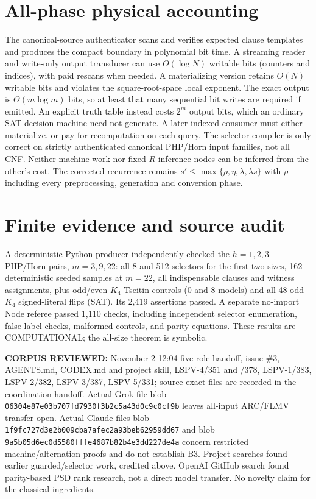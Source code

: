 \documentclass[11pt]{article}
\begin{document}
\section*{All-phase physical accounting}
The canonical-source authenticator scans and verifies expected clause templates and produces the compact boundary in polynomial bit time. A streaming reader and write-only output transducer can use $O(\log N)$ writable bits (counters and indices), with paid rescans when needed. A materializing version retains $O(N)$ writable bits and violates the square-root-space local exponent. The exact output is $\Theta(m\log m)$ bits, so at least that many sequential bit writes are required if emitted. An explicit truth table instead costs $2^m$ output bits, which an ordinary SAT decision machine need not generate. A later indexed consumer must either materialize, or pay for recomputation on each query. The selector compiler is only correct on strictly authenticated canonical PHP/Horn input families, not all CNF. Neither machine work nor fixed-$R$ inference nodes can be inferred from the other's cost. The corrected recurrence remains $s'\le\max\{\rho,\eta,\lambda,\lambda s\}$ with $\rho$ including every preprocessing, generation and conversion phase.

\section*{Finite evidence and source audit}
A deterministic Python producer independently checked the $h=1,2,3$ PHP/Horn pairs, $m=3,9,22$: all 8 and 512 selectors for the first two sizes, 162 deterministic seeded samples at $m=22$, all indispensable clauses and witness assignments, plus odd/even $K_4$ Tseitin controls (0 and 8 models) and all 48 odd-$K_4$ signed-literal flips (SAT). Its 2,419 assertions passed. A separate no-import Node referee passed 1,110 checks, including independent selector enumeration, false-label checks, malformed controls, and parity equations. These results are COMPUTATIONAL; the all-size theorem is symbolic.

\sloppy\noindent\textbf{CORPUS REVIEWED:} November 2 12:04 five-role handoff, issue \#3, AGENTS.md, CODEX.md and project skill, LSPV-4/351 and /378, LSPV-1/383, LSPV-2/382, LSPV-3/387, LSPV-5/331; source exact files are recorded in the coordination handoff. Actual Grok file  blob \texttt{06304e87e03b707fd7930f3b2c5a43d0c9c0cf9b} leaves all-input ARC/FLMV transfer open. Actual Claude files  blob \texttt{1f9fc727d3e2b009cba7afec2a93beb62959dd67} and  blob \texttt{9a5b05d6ec0d5580fffe4687b82b4e3dd227de4a} concern restricted machine/alternation proofs and do not establish B3. Project searches found earlier guarded/selector work, credited above. OpenAI GitHub search found parity-based PSD rank research, not a direct model transfer. No novelty claim for the classical ingredients.\fussy
\end{document}
